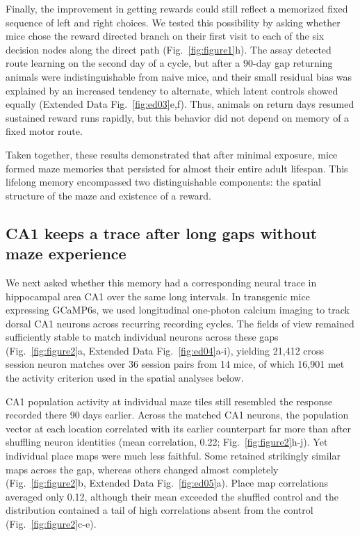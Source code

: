 \documentclass[fleqn,10pt]{wlscirep}
\begin{document}
Finally, the improvement in getting rewards could still reflect a memorized fixed sequence of left and right choices. We tested this possibility by asking whether mice chose the reward directed branch on their first visit to each of the six decision nodes along the direct path (Fig.~\ref{fig:figure1}h). The assay detected route learning on the second day of a cycle, but after a 90-day gap returning animals were indistinguishable from naive mice, and their small residual bias was explained by an increased tendency to alternate, which latent controls showed equally (Extended Data Fig.~\ref{fig:ed03}e,f). Thus, animals on return days resumed sustained reward runs rapidly, but this behavior did not depend on memory of a fixed motor route.

Taken together, these results demonstrated that after minimal exposure, mice formed maze memories that persisted for almost their entire adult lifespan. This lifelong memory encompassed two distinguishable components: the spatial structure of the maze and existence of a reward.

\subsection*{CA1 keeps a trace after long gaps without maze experience}
We next asked whether this memory had a corresponding neural trace in hippocampal area CA1 over the same long intervals. In transgenic mice expressing GCaMP6s, we used longitudinal one-photon calcium imaging to track dorsal CA1 neurons across recurring recording cycles. The fields of view remained sufficiently stable to match individual neurons across these gaps (Fig.~\ref{fig:figure2}a, Extended Data Fig.~\ref{fig:ed04}a-i), yielding 21{,}412 cross session neuron matches over 36 session pairs from 14 mice, of which 16{,}901 met the activity criterion used in the spatial analyses below.

CA1 population activity at individual maze tiles still resembled the response recorded there 90 days earlier. Across the matched CA1 neurons, the population vector at each location correlated with its earlier counterpart far more than after shuffling neuron identities (mean correlation, 0.22; Fig.~\ref{fig:figure2}h-j). Yet individual place maps were much less faithful. Some retained strikingly similar maps across the gap, whereas others changed almost completely (Fig.~\ref{fig:figure2}b, Extended Data Fig.~\ref{fig:ed05}a). Place map correlations averaged only 0.12, although their mean exceeded the shuffled control and the distribution contained a tail of high correlations absent from the control (Fig.~\ref{fig:figure2}c-e). 
\end{document}
